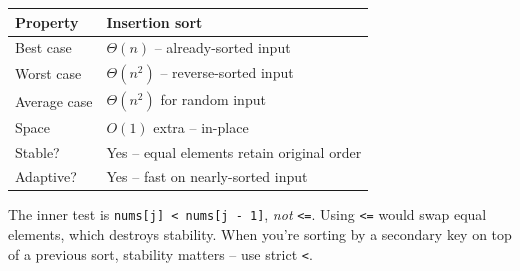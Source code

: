 \documentclass[11pt]{article}
\begin{document}
\begin{center}
\footnotesize
\renewcommand{\arraystretch}{1.25}
\begin{tabular}{@{}ll@{}}
\hline
\textbf{Property}   & \textbf{Insertion sort} \\
\hline
Best case           & $\Theta(n)$ -- already-sorted input \\
Worst case          & $\Theta(n^2)$ -- reverse-sorted input \\
Average case        & $\Theta(n^2)$ for random input \\
Space               & $O(1)$ extra -- in-place \\
Stable?             & Yes -- equal elements retain original order \\
Adaptive?           & Yes -- fast on nearly-sorted input \\
\hline
\end{tabular}
\end{center}

\begin{warnbox}
The inner test is \texttt{nums[j] < nums[j - 1]}, \emph{not}
\texttt{<=}. Using \texttt{<=} would swap equal elements, which
destroys stability. When you're sorting by a secondary key on top
of a previous sort, stability matters -- use strict \texttt{<}.
\end{warnbox}
\end{document}
